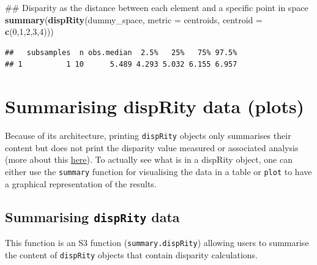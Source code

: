 \documentclass[]{book}
\newenvironment{Shaded}{\begin{snugshade}}{\end{snugshade}}
\newcommand{\KeywordTok}[1]{\textcolor[rgb]{0.13,0.29,0.53}{\textbf{#1}}}
\newcommand{\DataTypeTok}[1]{\textcolor[rgb]{0.13,0.29,0.53}{#1}}
\newcommand{\DecValTok}[1]{\textcolor[rgb]{0.00,0.00,0.81}{#1}}
\newcommand{\NormalTok}[1]{#1}
\theoremstyle{definition}
\theoremstyle{definition}
\theoremstyle{remark}
\begin{document}
\begin{Shaded}
\begin{Highlighting}[]
\NormalTok{## Disparity as the distance between each element and a specific point in space}
\KeywordTok{summary}\NormalTok{(}\KeywordTok{dispRity}\NormalTok{(dummy_space, }\DataTypeTok{metric =}\NormalTok{ centroids, }\DataTypeTok{centroid =} \KeywordTok{c}\NormalTok{(}\DecValTok{0}\NormalTok{,}\DecValTok{1}\NormalTok{,}\DecValTok{2}\NormalTok{,}\DecValTok{3}\NormalTok{,}\DecValTok{4}\NormalTok{)))}
\end{Highlighting}
\end{Shaded}

\begin{verbatim}
##   subsamples  n obs.median  2.5%   25%   75% 97.5%
## 1          1 10      5.489 4.293 5.032 6.155 6.957
\end{verbatim}

\section{Summarising dispRity data
(plots)}\label{summarising-disprity-data-plots}

Because of its architecture, printing \texttt{dispRity} objects only
summarises their content but does not print the disparity value measured
or associated analysis (more about this
\protect\hyperlink{manipulating-dispRity-objects}{here}). To actually
see what is in a dispRity object, one can either use the
\texttt{summary} function for visualising the data in a table or
\texttt{plot} to have a graphical representation of the results.

\subsection{\texorpdfstring{Summarising \texttt{dispRity}
data}{Summarising dispRity data}}\label{summarising-disprity-data}

This function is an S3 function (\texttt{summary.dispRity}) allowing
users to summarise the content of \texttt{dispRity} objects that contain
disparity calculations.
\end{document}
